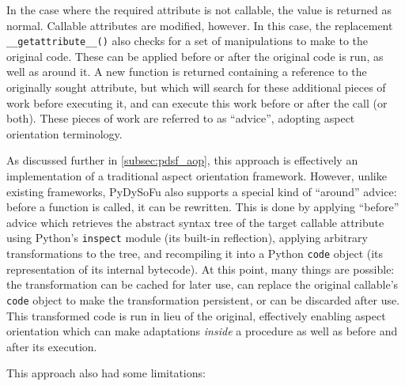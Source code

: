 







In the case where the required attribute is not callable, the value is returned
as normal. Callable attributes are modified, however. In this case, the
replacement \lstinline{__getattribute__()} also checks for a set of
manipulations to make to the original code. These can be applied before or after
the original code is run, as well as around it. A new function is returned
containing a reference to the originally sought attribute, but which will search
for these additional pieces of work before executing it, and can execute this
work before or after the call (or both). These pieces of work are referred to as
``advice'', adopting aspect orientation terminology.

As discussed further in \cref{subsec:pdsf_aop}, this approach is effectively an
implementation of a traditional aspect orientation framework. However, unlike
existing frameworks, PyDySoFu also supports a special kind of ``around'' advice:
before a function is called, it can be rewritten. This is done by applying
``before'' advice which retrieves the abstract syntax tree of the target
callable attribute using Python's \lstinline{inspect} module (its built-in
reflection), applying arbitrary transformations to the tree, and recompiling it
into a Python \lstinline{code} object (its representation of its
internal bytecode). At this point, many things are possible: the transformation
can be cached for later use, can replace the original callable's
\lstinline{code} object to make the transformation persistent, or can be
discarded after use. This transformed code is run in lieu of the original,
effectively enabling aspect orientation which can make adaptations \emph{inside}
a procedure as well as before and after its execution.

This approach also had some limitations:

